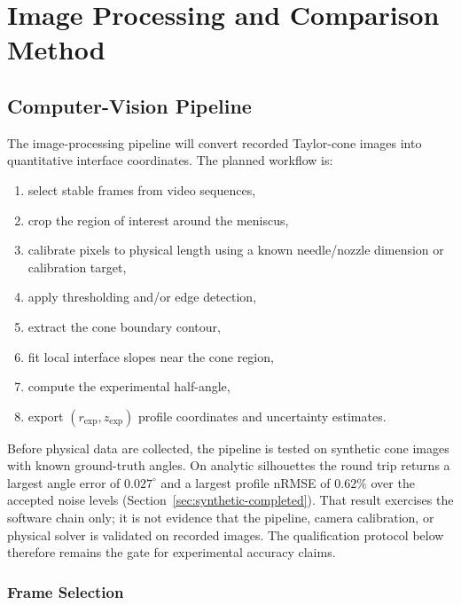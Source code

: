 \section{Image Processing and Comparison Method}\label{sec:image-processing}

\subsection{Computer-Vision Pipeline}

The image-processing pipeline will convert recorded Taylor-cone images into quantitative interface coordinates. The planned workflow is:
\begin{enumerate}
    \item select stable frames from video sequences,
    \item crop the region of interest around the meniscus,
    \item calibrate pixels to physical length using a known needle/nozzle dimension or calibration target,
    \item apply thresholding and/or edge detection,
    \item extract the cone boundary contour,
    \item fit local interface slopes near the cone region,
    \item compute the experimental half-angle,
    \item export $(r_{\mathrm{exp}},z_{\mathrm{exp}})$ profile coordinates and uncertainty estimates.
\end{enumerate}

Before physical data are collected, the pipeline is tested on synthetic cone images with known ground-truth angles. On analytic silhouettes the round trip returns a largest angle error of $0.027^{\circ}$ and a largest profile nRMSE of $0.62\%$ over the accepted noise levels (Section~\ref{sec:synthetic-completed}). That result exercises the software chain only; it is not evidence that the pipeline, camera calibration, or physical solver is validated on recorded images. The qualification protocol below therefore remains the gate for experimental accuracy claims.

\subsubsection{Frame Selection}

